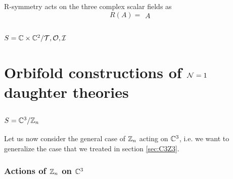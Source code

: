 \documentclass[a4paper,10pt]{article}
\begin{document}
        R-symmetry acts on the three complex scalar fields as
        \begin{equation}
            R(A) =
            \begin{matrix}
                A
            \end{matrix}
        \end{equation}

    \subsection{$S=\mathbb{C}\times\mathbb{C}^2/\mathcal{T},\mathcal{O},\mathcal{I}$}






\section{Orbifold constructions of $\mathcal{N}=1$ daughter theories}

    \subsection{$S=\mathbb{C}^3/\mathbb{Z}_n$}

        Let us now consider the general case of $\mathbb{Z}_n$ acting on $\mathbb{C}^3$, i.e. we want to generalize the case that we treated in section \ref{sec:C3Z3}. 
        
        \subsubsection{Actions of $\mathbb{Z}_n$ on $\mathbb{C}^3$}
        
\end{document}
